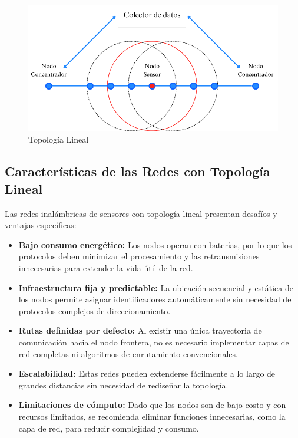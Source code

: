 \begin{figure}[H]
    \centering
    \includegraphics[width=0.8\linewidth]{Documento/Imagenes/Marco Teorico/Topologia lineal.pdf}
    \caption{Topología Lineal}
    \label{fig:topologia_lineal}
\end{figure}


\subsection{Características de las Redes con Topología Lineal}

Las redes inalámbricas de sensores con topología lineal presentan desafíos y ventajas específicas:

\begin{itemize}
    \item \textbf{Bajo consumo energético:} Los nodos operan con baterías, por lo que los protocolos deben minimizar el procesamiento y las retransmisiones innecesarias para extender la vida útil de la red.
    \item \textbf{Infraestructura fija y predictable:} La ubicación secuencial y estática de los nodos permite asignar identificadores automáticamente sin necesidad de protocolos complejos de direccionamiento.
    \item \textbf{Rutas definidas por defecto:} Al existir una única trayectoria de comunicación hacia el nodo frontera, no es necesario implementar capas de red completas ni algoritmos de enrutamiento convencionales.
    \item \textbf{Escalabilidad:} Estas redes pueden extenderse fácilmente a lo largo de grandes distancias sin necesidad de rediseñar la topología.
    \item \textbf{Limitaciones de cómputo:} Dado que los nodos son de bajo costo y con recursos limitados, se recomienda eliminar funciones innecesarias, como la capa de red, para reducir complejidad y consumo.
\end{itemize}

